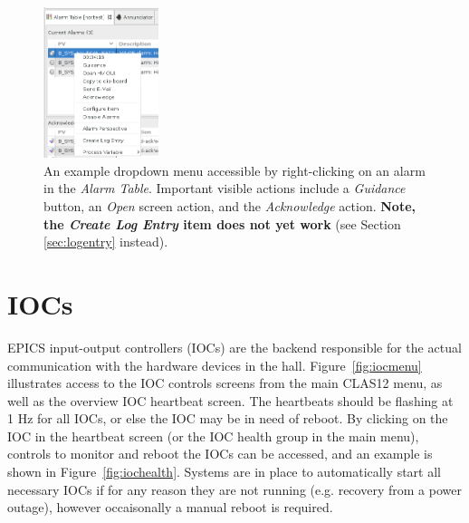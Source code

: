\documentclass[amsmath,amssymb,notitlepage,11pt]{revtex4}
\begin{document}
\begin{figure}[htbp]\centering
  \includegraphics[width=0.3\textwidth]{pics/alarmguide}
  \caption{An example dropdown menu accessible by right-clicking on an alarm in the {\em Alarm Table}.  Important visible actions include a {\em Guidance} button, an {\em Open} screen action, and the {\em Acknowledge} action.  {\bf Note, the {\em Create Log Entry} item does not yet work} (see Section \ref{sec:logentry} instead).\label{fig:alarmguide}}
\end{figure}

\section{IOCs}
EPICS input-output controllers (IOCs) are the backend responsible for the actual communication with the hardware devices in the hall.  Figure~\ref{fig:iocmenu} illustrates access to the IOC controls screens from the main CLAS12 menu, as well as the overview IOC heartbeat screen.  The heartbeats should be flashing at 1 Hz for all IOCs, or else the IOC may be in need of reboot.  By clicking on the IOC in the heartbeat screen (or the IOC health group in the main menu), controls to monitor and reboot the IOCs can be accessed, and an example is shown in Figure~\ref{fig:iochealth}.  Systems are in place to automatically start all necessary IOCs if for any reason they are not running (e.g. recovery from a power outage), however occaisonally a manual reboot is required.
\end{document}
